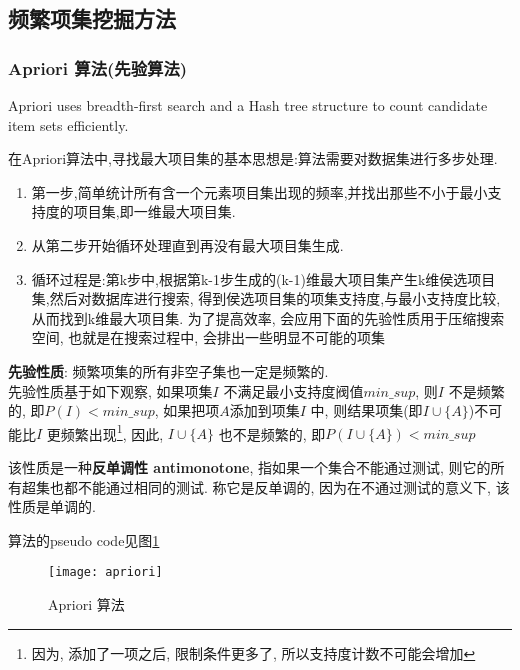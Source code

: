\documentclass{article}
\begin{document}
\subsection{频繁项集挖掘方法}
\subsubsection{Apriori 算法(先验算法)}
Apriori uses breadth-first search and a Hash tree structure to count candidate item sets efficiently.

在Apriori算法中,寻找最大项目集的基本思想是:算法需要对数据集进行多步处理.
\begin{enumerate}
	\item 第一步,简单统计所有含一个元素项目集出现的频率,并找出那些不小于最小支持度的项目集,即一维最大项目集.
	\item 从第二步开始循环处理直到再没有最大项目集生成.
	\item 循环过程是:第k步中,根据第k-1步生成的(k-1)维最大项目集产生k维侯选项目集,然后对数据库进行搜索,
			得到侯选项目集的项集支持度,与最小支持度比较,从而找到k维最大项目集. 为了提高效率, 会应用下面的先验性质用于压缩搜索空间,
			也就是在搜索过程中, 会排出一些明显不可能的项集
\end{enumerate}

\textbf{先验性质}: 频繁项集的所有非空子集也一定是频繁的.\\
先验性质基于如下观察, 如果项集$I$ 不满足最小支持度阀值$min\_sup$, 则$I$ 不是频繁的, 即$P(I) < min\_sup$, 如果把项$A$添加到项集$I$ 中, 则结果项集(即$I \cup \{A\}$)不可能比$I$ 更频繁出现\footnote{因为, 添加了一项之后, 限制条件更多了, 所以支持度计数不可能会增加}, 因此, $I \cup \{A\}$ 也不是频繁的, 即$P(I \cup \{A\}) < min\_sup$

该性质是一种\textbf{反单调性 antimonotone}, 指如果一个集合不能通过测试, 则它的所有超集也都不能通过相同的测试. 称它是反单调的, 因为在不通过测试的意义下, 该性质是单调的.

算法的pseudo code见图\ref{fig.apriori}
\begin{figure}[htbp]
  \centering
  \texttt{[image: apriori]}\\
  \caption{Apriori 算法}\label{fig.apriori}
\end{figure}
\end{document}
